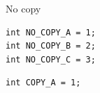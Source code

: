 \documentclass[aspectratio=169,10pt]{beamer}
\begin{document}
\begin{frame}[fragile]{No copy}
	\begin{lstlisting}
int NO_COPY_A = 1;
int NO_COPY_B = 2;
int NO_COPY_C = 3;
	\end{lstlisting}
	\begin{lstlisting}[copynumbers=true, firstnumber=71]
int COPY_A = 1;
	\end{lstlisting}
\end{frame}
\end{document}
